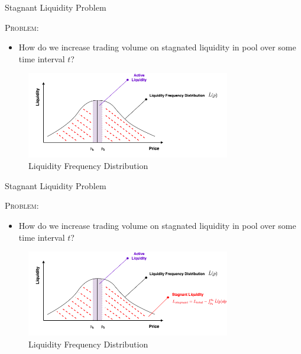 \documentclass[10pt,xcolor=svgnames]{beamer} %
\begin{document}
\begin{frame}{Stagnant Liquidity Problem} 

\begin{exampleblock}{\textsc{Problem:}}
\begin{itemize}
  \item How do we increase trading volume on stagnated liquidity in pool over some time interval $t$?
\end{itemize}
\end{exampleblock}

\begin{figure}[h!]
\includegraphics[width=3.5in]{img/freq2.png}
\caption{ Liquidity Frequency Distribution} 
\label{fig:full_tree}
\end{figure}

\end{frame}


\begin{frame}{Stagnant Liquidity Problem} 

\begin{exampleblock}{\textsc{Problem:}}
\begin{itemize}
  \item How do we increase trading volume on stagnated liquidity in pool over some time interval $t$?
\end{itemize}
\end{exampleblock}

\begin{figure}[h!]
\includegraphics[width=3.5in]{img/freq3.png}
\caption{ Liquidity Frequency Distribution} 
\label{fig:full_tree}
\end{figure}

\end{frame}
\end{document}
